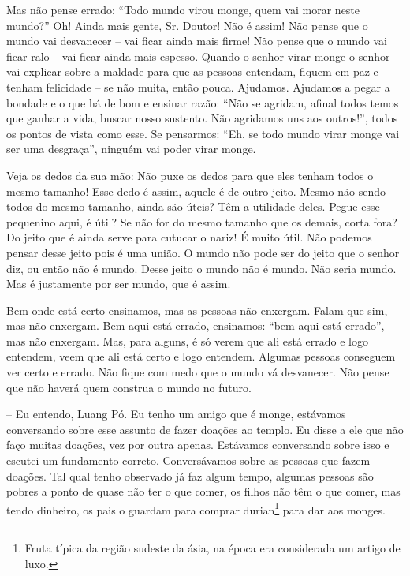 Mas não pense errado: “Todo mundo virou monge, quem vai morar neste
mundo?” Oh! Ainda mais gente, Sr. Doutor! Não é assim! Não pense que o
mundo vai desvanecer – vai ficar ainda mais firme! Não pense que o
mundo vai ficar ralo – vai ficar ainda mais espesso. Quando o senhor
virar monge o senhor vai explicar sobre a maldade para que as pessoas
entendam, fiquem em paz e tenham felicidade – se não muita, então
pouca. Ajudamos. Ajudamos a pegar a bondade e o que há de bom e ensinar
razão: “Não se agridam, afinal todos temos que ganhar a vida, buscar
nosso sustento. Não agridamos uns aos outros!”, todos os pontos de
vista como esse. Se pensarmos: “Eh, se todo mundo virar monge vai ser
uma desgraça”, ninguém vai poder virar monge. 

Veja os dedos da sua mão: Não puxe os dedos para que eles tenham
todos o mesmo tamanho! Esse dedo é assim, aquele é de outro jeito.
Mesmo não sendo todos do mesmo tamanho, ainda são úteis? Têm a
utilidade deles. Pegue esse pequenino aqui, é útil? Se não for do mesmo
tamanho que os demais, corta fora? Do jeito que é ainda serve para
cutucar o nariz! É muito útil. Não podemos pensar desse jeito pois é
uma união. O mundo não pode ser do jeito que o senhor diz, ou então não
é mundo. Desse jeito o mundo não é mundo. Não seria mundo. Mas é
justamente por ser mundo, que é assim. 

Bem onde está certo ensinamos, mas as pessoas não enxergam. Falam
que sim, mas não enxergam. Bem aqui está errado, ensinamos: “bem aqui
está errado”, mas não enxergam. Mas, para alguns, é só verem que ali
está errado e logo entendem, veem que ali está certo e logo entendem.
Algumas pessoas conseguem ver certo e errado. Não fique com medo que o
mundo vá desvanecer. Não pense que não haverá quem construa o mundo no
futuro.

-- Eu entendo, Luang Pó. Eu tenho um amigo que é monge, estávamos
conversando sobre esse assunto de fazer doações ao templo. Eu disse a
ele que não faço muitas doações, vez por outra apenas. Estávamos
conversando sobre isso e escutei um fundamento correto. Conversávamos
sobre as pessoas que fazem doações. Tal qual tenho observado já faz
algum tempo, algumas pessoas são pobres a ponto de quase não ter o que
comer, os filhos não têm o que comer, mas tendo dinheiro, os pais o
guardam para comprar durian\footnote{Fruta típica da região sudeste da
ásia, na época era considerada um artigo de luxo.} para dar aos monges.

